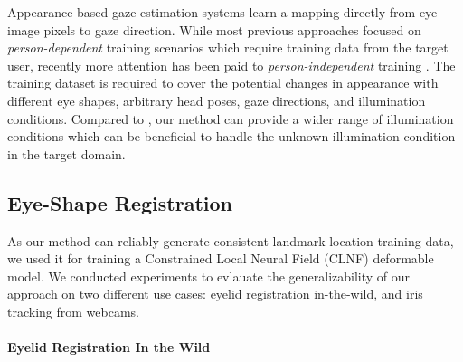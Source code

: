 Appearance-based gaze estimation systems learn a mapping directly from eye image pixels to gaze direction.
While most previous approaches focused on {\em person-dependent} training scenarios which require training data from the target user, recently more attention has been paid to {\em person-independent} training \cite{zhang15_cvpr,sugano2014learning,funes2013person,schneider2014manifold}. 
The training dataset is required to cover the potential changes in appearance with different eye shapes, arbitrary head poses, gaze directions, and illumination conditions.
%
Compared to \citet{sugano2014learning}, our method can provide a wider range of illumination conditions which can be beneficial to handle the unknown illumination condition in the target domain.


\subsection{Eye-Shape Registration}

As our method can reliably generate consistent landmark location training data, we used it for training a Constrained Local Neural Field (CLNF) \cite{baltrusaitis2013constrained} deformable model. We conducted experiments to evlauate the generalizability of our approach on two different use cases: eyelid registration in-the-wild, and iris tracking from webcams.

\paragraph{Eyelid Registration In the Wild}


